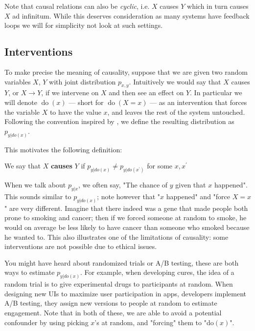 Note that causal relations can also be \textit{cyclic}, i.e. $X$ causes $Y$ which in turn causes 
$X$ ad infinitum. While this deserves consideration as many systems have feedback loops we will
for simplicity not look at such settings.

\subsection{Interventions}

To make precise the meaning of causality, suppose that we are given 
two random variables $X$, $Y$ with joint distribution $p_{x, y}$. Intuitively we 
would say that $X$ causes $Y$, or $X \rightarrow Y$, if we intervene on $X$ and then see an effect on $Y$. In particular
we will denote $\operatorname{do}(x)$ --- short for $\operatorname{do}(X = x)$ --- as an intervention
that forces the variable $X$ to have the value $x$, and leaves the rest of the system untouched. 
Following the convention inspired by \cite{pearl2000causality}, 
we define the resulting distribution as $p_{y|do(x)}$.

This motivates the following definition:

\begin{definition}
    We say that $X$ \textbf{causes} $Y$ if $p_{y|do(x)} \neq p_{y|do(x^\prime)}$ for some
    $x, x^\prime$
\end{definition}

When we talk about $p_{y|x}$, we often say, "The chance of $y$ given that $x$ happened". This sounds similar
to $p_{y|do(x)}$; note however that "$x$ happened" and "force $X = x$" are very different. Imagine that 
there indeed was a gene that made people both prone to smoking and cancer; then if we forced someone at 
random to smoke, he would on average be less likely to have cancer than someone who smoked because he wanted to.
This also illustrates 
one of the limitations of causality: some interventions are not possible due to ethical issues.

You might have heard about randomized trials or A/B testing, these are both ways to estimate $p_{y|do(x)}$.
For example, when developing cures, the idea of a random trial is to give experimental drugs to participants
at random. When designing new UIs to maximize user participation in apps, developers implement A/B testing, 
they assign new versions to people at random to estimate engagement. Note that in both of these, we are able 
to avoid a potential confounder by using picking $x$'s at random, and "forcing" them to "do$(x)$".

